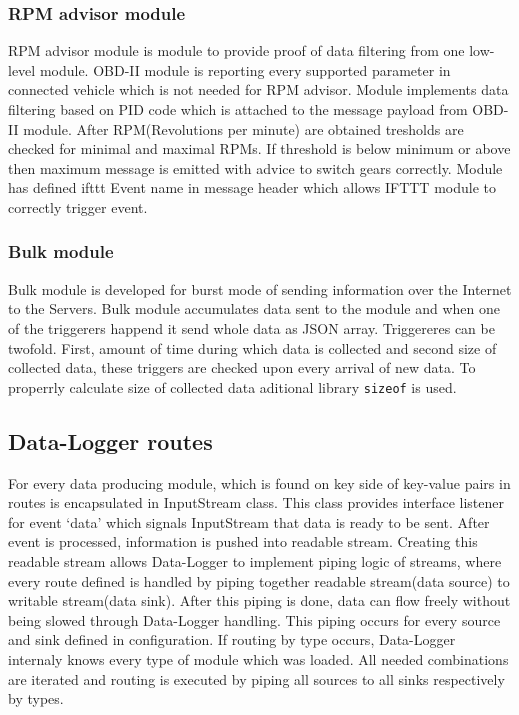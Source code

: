 \subsubsection{RPM advisor module} %
\label{ssub:rpm_advisor_module}
RPM advisor module is module to provide proof of data filtering from one low-level module. OBD-II module is reporting every supported parameter in connected vehicle which is not needed for RPM advisor. Module implements data filtering based on PID code which is attached to the message payload from OBD-II module. After RPM(Revolutions per minute) are obtained tresholds are checked for minimal and maximal RPMs. If threshold is below minimum or above then maximum message is emitted with advice to switch gears correctly. Module has defined ifttt Event name in message header which allows IFTTT module to correctly trigger event.

\subsubsection{Bulk module} %
\label{ssub:bulk_module}
Bulk module is developed for burst mode of sending information over the Internet to the Servers. Bulk module accumulates data sent to the module and when one of the triggerers happend it send whole data as JSON array. Triggereres can be twofold. First, amount of time during which data is collected and second size of collected data, these triggers are checked upon every arrival of new data. To properrly calculate size of collected data aditional library \verb|sizeof| is used.
\subsection{Data-Logger routes} %
\label{sub:data_logger_routes}
For every data producing module, which is found on key side of key-value pairs in routes is encapsulated in InputStream class. This class provides interface listener for event `data' which signals InputStream that data is ready to be sent. After event is processed, information is pushed into readable stream. Creating this readable stream allows Data-Logger to implement piping logic of streams, where every route defined is handled by piping together readable stream(data source) to writable stream(data sink). After this piping is done, data can flow freely without being slowed through Data-Logger handling. This piping occurs for every source and sink defined in configuration. If routing by type occurs, Data-Logger internaly knows every type of module which was loaded. All needed combinations are iterated and routing is executed by piping all sources to all sinks respectively by types.
